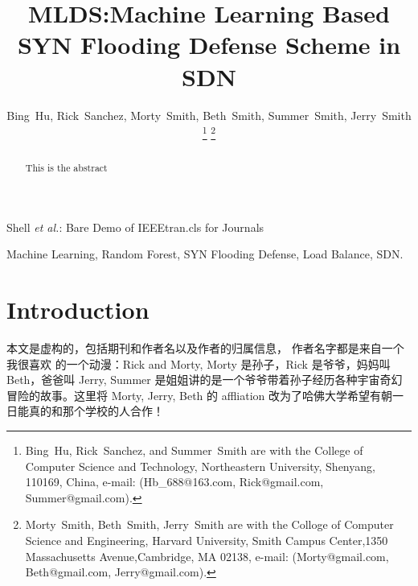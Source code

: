 \documentclass[journal]{IEEEtran}
\begin{document}
\title{MLDS:Machine Learning Based SYN Flooding Defense Scheme in SDN}

\author{Bing~Hu,
        Rick~Sanchez,
        Morty~Smith,
        Beth~Smith,
        Summer~Smith,
        Jerry~Smith

\thanks{Bing~Hu, Rick~Sanchez, and Summer~Smith are with the College of
Computer Science and Technology, Northeastern University,
Shenyang, 110169, China, e-mail: (Hb\_688@163.com,
Rick@gmail.com, Summer@gmail.com).}
\thanks{Morty~Smith, Beth~Smith, Jerry~Smith are with the Colloge of Computer Science and Engineering,
Harvard University, Smith Campus Center,1350 Massachusetts Avenue,Cambridge, MA 02138, e-mail:
(Morty@gmail.com, Beth@gmail.com, Jerry@gmail.com).}
}


{Shell \MakeLowercase{\textit{et al.}}: Bare Demo of IEEEtran.cls
for Journals}

\maketitle

\begin{abstract}
This is the abstract
\end{abstract}


\begin{IEEEkeywords}
Machine Learning, Random Forest, SYN Flooding Defense, Load Balance, SDN.
\end{IEEEkeywords}


\IEEEpeerreviewmaketitle



\section{Introduction}

本文是虚构的，包括期刊和作者名以及作者的归属信息，
作者名字都是来自一个我很喜欢
的一个动漫：Rick and Morty, Morty 是孙子，Rick 是爷爷，妈妈叫 Beth，爸爸叫 Jerry,
 Summer 是姐姐讲的是一个爷爷带着孙子经历各种宇宙奇幻冒险的故事。这里将 Morty, Jerry,
  Beth 的 affliation 改为了哈佛大学希望有朝一日能真的和那个学校的人合作！



\end{document}
